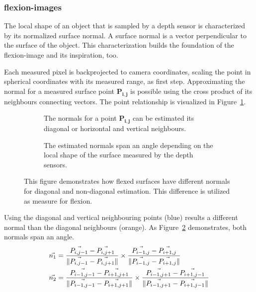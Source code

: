 \subsubsection{\Glspl{flexion-image}}\label{flexion-image-section}

The local shape of an object that is sampled by a depth sensor is characterized by its normalized surface normal.
A surface normal is a vector perpendicular to the surface of the object.
This characterization builds the foundation of the \Gls{flexion-image} and its inspiration, too.

Each measured pixel is backprojected to camera coordinates, scaling the point in spherical coordinates with its measured range, as first step.
Approximating the normal for a measured surface point $\mathbf{P_{i,j}}$ is possible using the cross product of its neighbours connecting vectors.
The point relationship is visualized in Figure~\ref{fig:flexion_normals_plane}.
\begin{figure}[H]
    \begin{subfigure}[t]{0.49\linewidth}
        \centering
        \scalebox{1.0}{%
        
        }
        \caption{The normals for a point $\mathbf{P_{i,j}}$ can be estimated its diagonal or horizontal and vertical neighbours.}\label{fig:flexion_normals_plane}
    \end{subfigure}
    \begin{subfigure}[t]{0.49\linewidth}
        \centering
        \scalebox{1.0}{%
        
        }
        \caption{The estimated normals span an angle depending on the local shape of the surface measured by the depth sensors.}\label{fig:flexion_space}
    \end{subfigure}
    \caption[Schematic Representation of Flexion]{This figure demonstrates how flexed surfaces have different normals for diagonal and non-diagonal estimation. This difference is utilized as measure for flexion.}%
    \label{fig:flexion-image-scetched}
\end{figure}
Using the diagonal and vertical neighbouring points (blue) results a different normal than the diagonal neighbours (orange).
As Figure~\ref{fig:flexion_space} demonstrates, both normals span an angle.
\begin{equation}
\begin{aligned}
    \vec{n_1} &= \frac{\vec{P_{i,j-1}} - \vec{P_{i,j+1}}}{\lVert\vec{P_{i,j-1}} - \vec{P_{i,j+1}}\rVert}
                \times \frac{\vec{P_{i-1,j}} - \vec{P_{i+1,j}}}{\lVert\vec{P_{i-1,j}} - \vec{P_{i+1,j}}\rVert} \\
    \vec{n_2} &= \frac{\vec{P_{i-1,j-1}} - \vec{P_{i+1,j+1}}}{\lVert\vec{P_{i-1,j-1}} - \vec{P_{i+1,j+1}}\rVert}
                \times \frac{\vec{P_{i-1,j+1}} - \vec{P_{i+1,j-1}}}{\lVert\vec{P_{i-1,j+1}} - \vec{P_{i+1,j-1}}\rVert}
    \label{eq:flexion_normals}
\end{aligned}
\end{equation}
